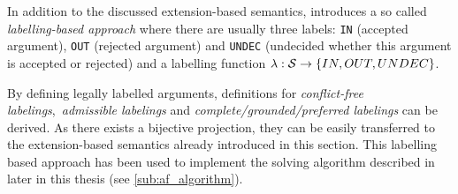 In addition to the discussed extension-based semantics, \cite{liao} introduces a so called \textit{labelling-based approach} where there are usually three labels: \texttt{IN} (accepted argument), \texttt{OUT} (rejected argument) and \texttt{UNDEC} (undecided whether this argument is accepted or rejected) and a labelling function $\lambda: \S \rightarrow \{IN, OUT, UNDEC\}$.

By defining legally labelled arguments, definitions for \textit{conflict-free labelings},~\textit{admissible labelings} and \textit{complete/grounded/preferred labelings} can be derived. As there exists a bijective projection, they can be easily transferred to the extension-based semantics already introduced in this section. This labelling based approach has been used to implement the solving algorithm described in \cite{Modgil2009Proof, rodrigues} later in this thesis (see \autoref{sub:af_algorithm}).

